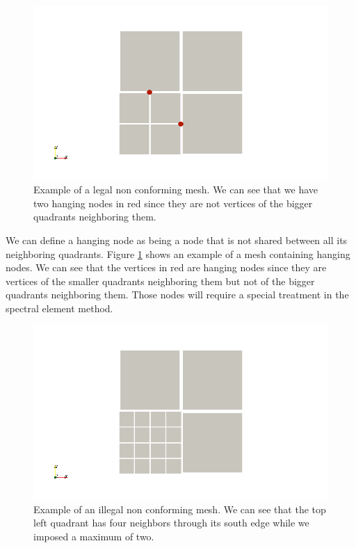\begin{figure}
\centering
\includegraphics[scale=0.45]{Theory/hang_ex.png}
\caption{Example of a legal non conforming mesh. We can see that we have two hanging nodes in red since they are not vertices of the bigger quadrants neighboring them.}
\label{hang_ex}
\end{figure}

We can define a hanging node as being a node that is not shared between all its neighboring quadrants. Figure \ref{hang_ex} shows an example of a mesh containing hanging nodes. We can see that the vertices in red are hanging nodes since they are vertices of the smaller quadrants neighboring them but not of the bigger quadrants neighboring them. Those nodes will require a special treatment in the spectral element method. 

\begin{figure}
\centering
\includegraphics[scale=0.45]{Theory/hang_illegal.png}
\caption{Example of an illegal non conforming mesh. We can see that the top left quadrant has four neighbors through its south edge while we imposed a maximum of two. }
\label{hang_illegal}
\end{figure}

